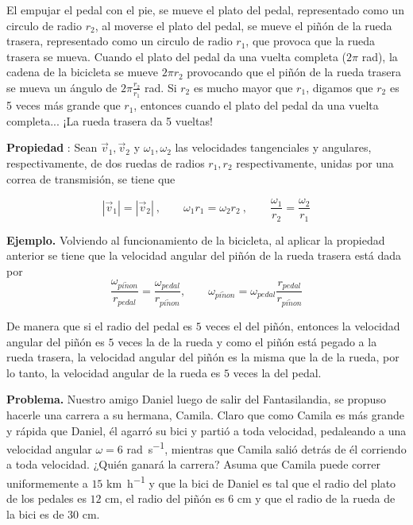 \documentclass[letterpaper]{article}
\newcounter{propiedades}
\newcommand{\propi}{\stepcounter{propiedades} \textbf{Propiedad \thepropiedades}: }
\newenvironment{prop}
{ \begin{framed} \propi}
{ \end{framed} }
\begin{document}
El empujar el pedal con el pie, se mueve el plato del pedal, representado como un circulo de radio $r_2$, al moverse el plato del pedal, se mueve el piñón de la rueda trasera, representado como un circulo de radio $r_1$, que provoca que la rueda trasera se mueva. Cuando el plato del pedal da una vuelta completa ($2\pi$ \si{rad}), la cadena de la bicicleta se mueve $2\pi r_2$ provocando que el piñón de la rueda trasera se mueva un ángulo de $2\pi\frac{r_2}{r_1}$ \si{rad}. Si $r_2$ es mucho mayor que $r_1$, digamos que $r_2$ es 5 veces más grande que $r_1$, entonces cuando el plato del pedal da una vuelta completa... ¡La rueda trasera da 5 vueltas!

\begin{prop}
 Sean $\vec{v}_1, \vec{v}_2$ y $\omega_1, \omega_2$ las velocidades tangenciales y angulares, respectivamente, de dos ruedas de radios $r_1, r_2$ respectivamente, unidas por una correa de transmisión, se tiene que
 
 \begin{equation*}
|\vec{v}_1| = |\vec{v}_2|\ , \qquad \omega_1 r_1 = \omega_2 r_2\ , \qquad \frac{\omega_1}{r_2} = \frac{\omega_2}{r_1}
 \end{equation*}
 
\end{prop}

\vspace{.5cm}

\textbf{Ejemplo.} Volviendo al funcionamiento de la bicicleta, al aplicar la propiedad anterior se tiene que la velocidad angular del piñón de la rueda trasera está dada por $$\frac{\omega_{pi\tilde{n}on}}{r_{pedal}} = \frac{\omega_{pedal}}{r_{pi\tilde{n}on}}, \qquad \omega_{pi\tilde{n}on} = \omega_{pedal}\frac{r_{pedal}}{r_{pi\tilde{n}on}}$$


De manera que si el radio del pedal es $5$ veces el del piñón, entonces la velocidad angular del piñón es $5$ veces la de la rueda y como el piñón está pegado a la rueda trasera, la velocidad angular del piñón es la misma que la de la rueda, por lo tanto, la velocidad angular de la rueda es $5$ veces la del pedal. 

\vspace{.5cm}

\textbf{Problema.} Nuestro amigo Daniel luego de salir del Fantasilandia, se propuso hacerle una carrera a su hermana, Camila. Claro que como Camila es más grande y rápida que Daniel, él agarró su bici y partió a toda velocidad, pedaleando a una velocidad angular $\omega = 6$ \si{rad.s^{-1}}, mientras que Camila salió detrás de él corriendo a toda velocidad. ¿Quién ganará la carrera? Asuma que Camila puede correr uniformemente a $15$ \si{km.h^{-1}} y que la bici de Daniel es tal que el radio del plato de los pedales es $12$ \si{cm}, el radio del piñón es $6$ \si{cm} y que el radio de la rueda de la bici es de $30$ \si{cm}.
\end{document}
